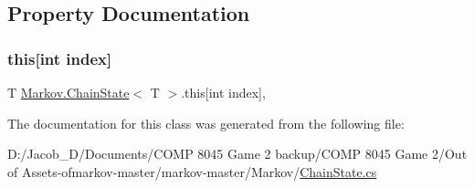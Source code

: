\subsection{Property Documentation}
\mbox{\label{class_markov_1_1_chain_state_ae06f12faf66236f004133d5cd08b22b4}} 
\subsubsection{\texorpdfstring{this[int index]}{this[int index]}}
{\footnotesize\ttfamily T \mbox{\hyperlink{class_markov_1_1_chain_state}{Markov.\+Chain\+State}}$<$ T $>$.this\mbox{[}int index\mbox{]}\hspace{0.3cm}{\ttfamily [get]}, {\ttfamily [set]}}







The documentation for this class was generated from the following file\+:\begin{DoxyCompactItemize}
\item 
D\+:/\+Jacob\+\_\+\+D/\+Documents/\+C\+O\+M\+P 8045 Game 2 backup/\+C\+O\+M\+P 8045 Game 2/\+Out of Assets-\/ofmarkov-\/master/markov-\/master/\+Markov/\mbox{\hyperlink{_chain_state_8cs}{Chain\+State.\+cs}}\end{DoxyCompactItemize}
